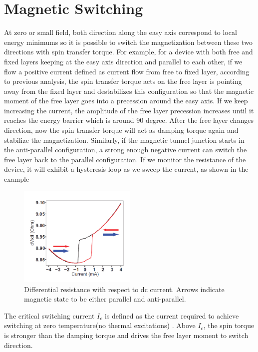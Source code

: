 \section{Magnetic Switching}

At zero or small field, both direction along the easy axis correspond to local energy minimums so it is possible to switch the magnetization between these two directions with spin transfer torque. For example, for a device with both free and fixed layers keeping at the easy axis direction and parallel to each other, if we flow a positive current defined as current flow from free to fixed layer, according to previous analysis, the spin transfer torque acts on the free layer is pointing away from the fixed layer and destabilizes this configuration so that the magnetic moment of the free layer goes into a precession around the easy axis. If we keep increasing the current, the amplitude of the free layer precession increases until it reaches the energy barrier which is around 90 degree. After the free layer changes direction, now the spin transfer torque will act as damping torque again and stabilize the magnetization. Similarly, if the magnetic tunnel junction starts in the anti-parallel configuration, a strong enough negative current can switch the free layer back to the parallel configuration. If we monitor the resistance of the device, it will exhibit a hysteresis loop as we sweep the current, as shown in the example

\begin{figure}[h!]
	\centering
	\includegraphics[width=0.5\textwidth]{fig/DC.PNG}
	\caption{Differential resistance with respect to dc current. Arrows indicate magnetic state to be either parallel and anti-parallel.}
	\label{fig:DC}
\end{figure}



The critical switching current $I_c$ is defined as the current required to achieve switching at zero temperature(no thermal excitations)  . Above $I_c$, the spin torque is stronger than the damping torque and drives the free layer moment to switch direction.

